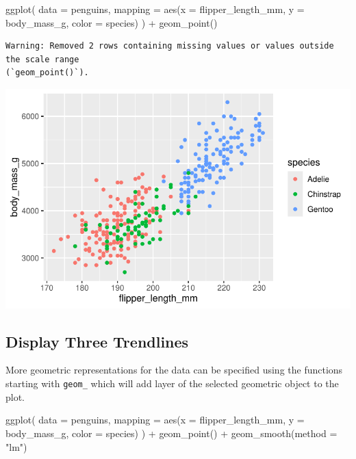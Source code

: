 \documentclass[
  letterpaper,
  DIV=11,
  numbers=noendperiod]{scrreprt}
\newenvironment{Shaded}{\begin{snugshade}}{\end{snugshade}}
\newcommand{\AttributeTok}[1]{\textcolor[rgb]{0.40,0.45,0.13}{#1}}
\newcommand{\FunctionTok}[1]{\textcolor[rgb]{0.28,0.35,0.67}{#1}}
\newcommand{\NormalTok}[1]{\textcolor[rgb]{0.00,0.23,0.31}{#1}}
\newcommand{\SpecialCharTok}[1]{\textcolor[rgb]{0.37,0.37,0.37}{#1}}
\newcommand{\StringTok}[1]{\textcolor[rgb]{0.13,0.47,0.30}{#1}}
\begin{document}
\begin{Shaded}
\begin{Highlighting}[]
\FunctionTok{ggplot}\NormalTok{(}
  \AttributeTok{data =}\NormalTok{ penguins,}
  \AttributeTok{mapping =} \FunctionTok{aes}\NormalTok{(}\AttributeTok{x =}\NormalTok{ flipper\_length\_mm, }\AttributeTok{y =}\NormalTok{ body\_mass\_g, }\AttributeTok{color =}\NormalTok{ species)}
\NormalTok{) }\SpecialCharTok{+}
  \FunctionTok{geom\_point}\NormalTok{()}
\end{Highlighting}
\end{Shaded}

\begin{verbatim}
Warning: Removed 2 rows containing missing values or values outside the scale range
(`geom_point()`).
\end{verbatim}

\includegraphics{src/r-for-data-science/01-data-viz_files/figure-pdf/unnamed-chunk-10-1.pdf}

\subsection{Display Three Trendlines}\label{display-three-trendlines}

More geometric representations for the data can be specified using the
functions starting with \texttt{geom\_} which will add layer of the
selected geometric object to the plot.

\begin{Shaded}
\begin{Highlighting}[]
\FunctionTok{ggplot}\NormalTok{(}
  \AttributeTok{data =}\NormalTok{ penguins,}
  \AttributeTok{mapping =} \FunctionTok{aes}\NormalTok{(}\AttributeTok{x =}\NormalTok{ flipper\_length\_mm, }\AttributeTok{y =}\NormalTok{ body\_mass\_g, }\AttributeTok{color =}\NormalTok{ species)}
\NormalTok{) }\SpecialCharTok{+}
  \FunctionTok{geom\_point}\NormalTok{() }\SpecialCharTok{+}
  \FunctionTok{geom\_smooth}\NormalTok{(}\AttributeTok{method =} \StringTok{"lm"}\NormalTok{)}
\end{Highlighting}
\end{Shaded}
\end{document}
